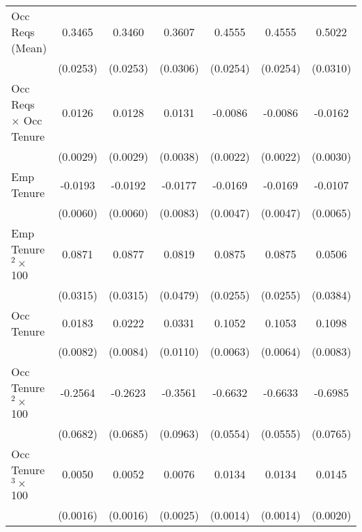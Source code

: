 {\begin{longtable}{l*{6}{c}}
Occ Reqs (Mean)     &      0.3465\sym{***}&      0.3460\sym{***}&      0.3607\sym{***}&      0.4555\sym{***}&      0.4555\sym{***}&      0.5022\sym{***}\\
                    &    (0.0253)         &    (0.0253)         &    (0.0306)         &    (0.0254)         &    (0.0254)         &    (0.0310)         \\
Occ Reqs $\times$ Occ Tenure&      0.0126\sym{***}&      0.0128\sym{***}&      0.0131\sym{***}&     -0.0086\sym{***}&     -0.0086\sym{***}&     -0.0162\sym{***}\\
                    &    (0.0029)         &    (0.0029)         &    (0.0038)         &    (0.0022)         &    (0.0022)         &    (0.0030)         \\
Emp Tenure          &     -0.0193\sym{***}&     -0.0192\sym{***}&     -0.0177\sym{**} &     -0.0169\sym{***}&     -0.0169\sym{***}&     -0.0107\sym{*}  \\
                    &    (0.0060)         &    (0.0060)         &    (0.0083)         &    (0.0047)         &    (0.0047)         &    (0.0065)         \\
Emp Tenure$^2\times$ 100&      0.0871\sym{***}&      0.0877\sym{***}&      0.0819\sym{*}  &      0.0875\sym{***}&      0.0875\sym{***}&      0.0506         \\
                    &    (0.0315)         &    (0.0315)         &    (0.0479)         &    (0.0255)         &    (0.0255)         &    (0.0384)         \\
Occ Tenure          &      0.0183\sym{**} &      0.0222\sym{***}&      0.0331\sym{***}&      0.1052\sym{***}&      0.1053\sym{***}&      0.1098\sym{***}\\
                    &    (0.0082)         &    (0.0084)         &    (0.0110)         &    (0.0063)         &    (0.0064)         &    (0.0083)         \\
Occ Tenure$^2\times$ 100&     -0.2564\sym{***}&     -0.2623\sym{***}&     -0.3561\sym{***}&     -0.6632\sym{***}&     -0.6633\sym{***}&     -0.6985\sym{***}\\
                    &    (0.0682)         &    (0.0685)         &    (0.0963)         &    (0.0554)         &    (0.0555)         &    (0.0765)         \\
Occ Tenure$^3\times$ 100&      0.0050\sym{***}&      0.0052\sym{***}&      0.0076\sym{***}&      0.0134\sym{***}&      0.0134\sym{***}&      0.0145\sym{***}\\
                    &    (0.0016)         &    (0.0016)         &    (0.0025)         &    (0.0014)         &    (0.0014)         &    (0.0020)         \\

\end{longtable}}
